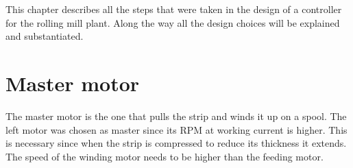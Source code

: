 This chapter describes all the steps that were taken in the design of a controller for the rolling mill plant. Along the way all the design choices will be explained and substantiated.

\section{Master motor}
The master motor is the one that pulls the strip and winds it up on a spool. The left motor was chosen as master since its RPM at working current is higher.  This is necessary since when the strip is compressed to reduce its thickness it extends. The speed of the winding motor needs to be higher than the feeding motor.




